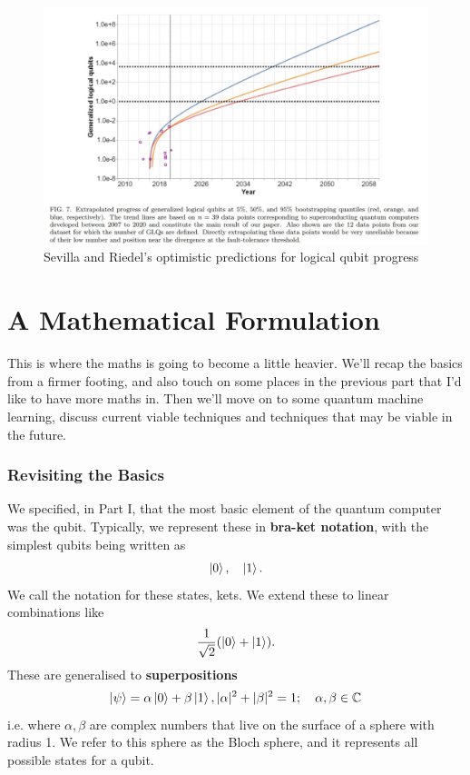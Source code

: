 \documentclass{article}
\theoremstyle{definition}
\begin{document}
\begin{figure}[htb]
    \centering
    \includegraphics[scale=0.5]{Generalised logical qubit progress.jpg}
    \caption{Sevilla and Riedel's optimistic predictions for logical qubit progress}
    \label{fig:my_label}
\end{figure}




\clearpage
\part{A Mathematical Formulation}
This is where the maths is going to become a little heavier. We'll recap the basics from a firmer footing, and also touch on some places in the previous part that I'd like to have more maths in. Then we'll move on to some quantum machine learning, discuss current viable techniques and techniques that may be viable in the future. 
\section{Revisiting the Basics}
We specified, in Part I, that the most basic element of the quantum computer was the qubit. Typically, we represent these in \textbf{bra-ket notation}, with the simplest qubits being written as
\[
\ket{0}, \quad \ket{1}.
\]
We call the notation for these states, kets. We extend these to linear combinations like
\[
 \frac{1}{\sqrt{2}} (\ket{0} + \ket{1}).
\]
These are generalised to \textbf{superpositions}
\[
\ket{\psi} = \alpha \ket{0} + \beta \ket{1}, | \alpha |^2 + | \beta |^2 =1; \quad \alpha, \beta \in \mathbb{C}
\]
i.e. where $\alpha, \beta$ are complex numbers that live on the surface of a sphere with radius 1. We refer to this sphere as the Bloch sphere, and it represents all possible states for a qubit.
\end{document}
